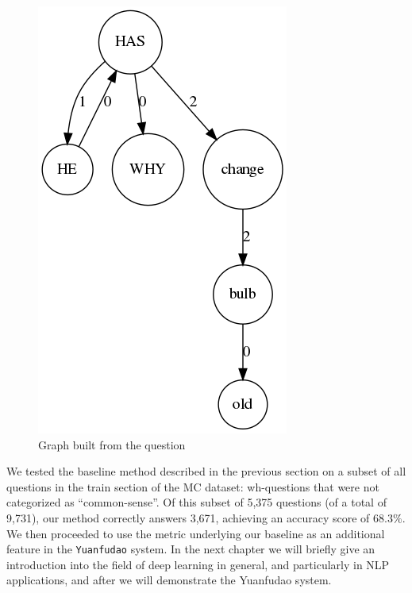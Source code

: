 \begin{figure}
	\centering
	\includegraphics[scale=0.3]{figures/compdef}
	\caption{Graph built from the question}
	\label{fig:merge3}
\end{figure}

We tested the baseline method described in the previous section on a
subset of all questions in the train section of the MC dataset:
wh-questions that were not
categorized as ``common-sense''. Of this subset of 5,375 questions (of a
total of 9,731), our
method correctly answers 3,671, achieving an accuracy score of $68.3\%$.
We then proceeded to use the metric underlying our baseline as an
additional feature in the \texttt{Yuanfudao} system. In the next chapter we will briefly give an introduction into the field of deep learning in general, and particularly in NLP applications, and after we will demonstrate the Yuanfudao system.